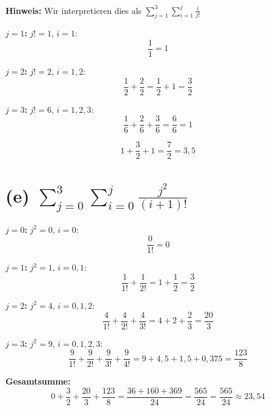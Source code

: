 \documentclass[12pt, a4paper]{article}
\begin{document}
\textbf{Hinweis:} Wir interpretieren dies als $\displaystyle\sum_{j=1}^{3} \sum_{i=1}^{j} \frac{i}{j!}$

\textbf{$j = 1$:} $j! = 1$, $i = 1$:
\[
    \frac{1}{1} = 1
\]

\textbf{$j = 2$:} $j! = 2$, $i = 1, 2$:
\[
    \frac{1}{2} + \frac{2}{2} = \frac{1}{2} + 1 = \frac{3}{2}
\]

\textbf{$j = 3$:} $j! = 6$, $i = 1, 2, 3$:
\[
    \frac{1}{6} + \frac{2}{6} + \frac{3}{6} = \frac{6}{6} = 1
\]

\[
    \boxed{1 + \frac{3}{2} + 1 = \frac{7}{2} = 3{,}5}
\]

\section*{(e) $\displaystyle\sum_{j=0}^{3} \sum_{i=0}^{j} \frac{j^2}{(i+1)!}$}

\textbf{$j = 0$:} $j^2 = 0$, $i = 0$:
\[
    \frac{0}{1!} = 0
\]

\textbf{$j = 1$:} $j^2 = 1$, $i = 0, 1$:
\[
    \frac{1}{1!} + \frac{1}{2!} = 1 + \frac{1}{2} = \frac{3}{2}
\]

\textbf{$j = 2$:} $j^2 = 4$, $i = 0, 1, 2$:
\[
    \frac{4}{1!} + \frac{4}{2!} + \frac{4}{3!} = 4 + 2 + \frac{2}{3} = \frac{20}{3}
\]

\textbf{$j = 3$:} $j^2 = 9$, $i = 0, 1, 2, 3$:
\[
    \frac{9}{1!} + \frac{9}{2!} + \frac{9}{3!} + \frac{9}{4!} = 9 + 4{,}5 + 1{,}5 + 0{,}375 = \frac{123}{8}
\]

\textbf{Gesamtsumme:}
\[
    0 + \frac{3}{2} + \frac{20}{3} + \frac{123}{8} = \frac{36 + 160 + 369}{24} = \frac{565}{24} = \boxed{\frac{565}{24} \approx 23{,}54}
\]
\end{document}
